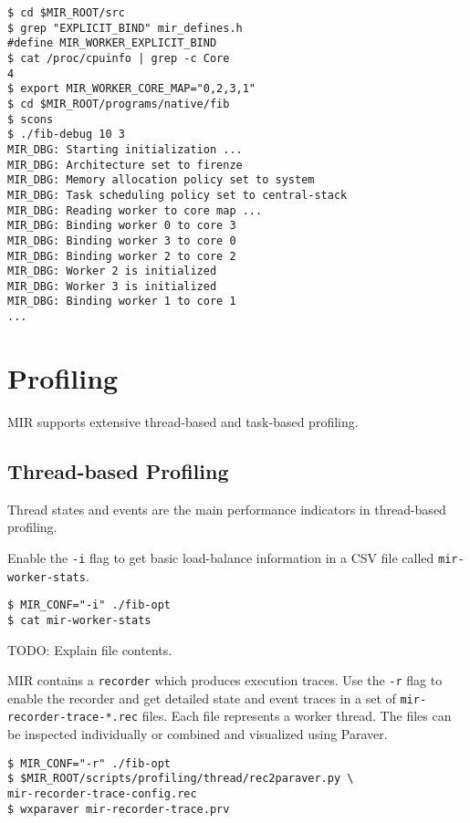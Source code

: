 \documentclass[11pt,a4paper]{article}
\begin{document}
\begin{lstlisting}[style=MyInputStyle]
$ cd $MIR_ROOT/src
$ grep "EXPLICIT_BIND" mir_defines.h
#define MIR_WORKER_EXPLICIT_BIND
$ cat /proc/cpuinfo | grep -c Core
4
$ export MIR_WORKER_CORE_MAP="0,2,3,1"
$ cd $MIR_ROOT/programs/native/fib
$ scons 
$ ./fib-debug 10 3
MIR_DBG: Starting initialization ...
MIR_DBG: Architecture set to firenze
MIR_DBG: Memory allocation policy set to system
MIR_DBG: Task scheduling policy set to central-stack
MIR_DBG: Reading worker to core map ...
MIR_DBG: Binding worker 0 to core 3
MIR_DBG: Binding worker 3 to core 0
MIR_DBG: Binding worker 2 to core 2
MIR_DBG: Worker 2 is initialized
MIR_DBG: Worker 3 is initialized
MIR_DBG: Binding worker 1 to core 1
...
\end{lstlisting}

\section{Profiling}\label{profiling}

MIR supports extensive thread-based and task-based profiling.

\subsection{Thread-based Profiling}\label{thread-based-profiling}

Thread states and events are the main performance indicators in thread-based profiling.

Enable the \texttt{-i} flag to get basic load-balance information in a CSV file called \texttt{mir-worker-stats}.

\begin{lstlisting}[style=MyInputStyle]
$ MIR_CONF="-i" ./fib-opt
$ cat mir-worker-stats
\end{lstlisting}

TODO: Explain file contents.

MIR contains a \texttt{recorder} which produces execution traces. Use the \texttt{-r} flag to enable the recorder and get detailed state and event traces in a set of \texttt{mir-recorder-trace-*.rec} files.  Each file represents a worker thread. The files can be inspected individually or combined and visualized using Paraver.

\begin{lstlisting}[style=MyInputStyle]
$ MIR_CONF="-r" ./fib-opt
$ $MIR_ROOT/scripts/profiling/thread/rec2paraver.py \
mir-recorder-trace-config.rec 
$ wxparaver mir-recorder-trace.prv
\end{lstlisting}
\end{document}
